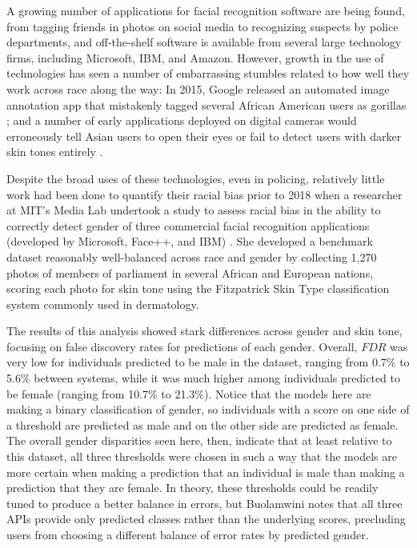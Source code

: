 \documentclass[]{krantz}
\begin{document}
A growing number of applications for facial recognition software are
being found, from tagging friends in photos on social media to
recognizing suspects by police departments, and off-the-shelf software
is available from several large technology firms, including Microsoft,
IBM, and Amazon. However, growth in the use of technologies has seen a
number of embarrassing stumbles related to how well they work across
race along the way: In 2015, Google released an automated image
annotation app that mistakenly tagged several African American users as
gorillas \citep{dougherty2015}; and a number of early applications
deployed on digital cameras would erroneously tell Asian users to open
their eyes or fail to detect users with darker skin tones entirely
\citep{rose2010}.

Despite the broad uses of these technologies, even in policing,
relatively little work had been done to quantify their racial bias prior
to 2018 when a researcher at MIT's Media Lab undertook a study to assess
racial bias in the ability to correctly detect gender of three
commercial facial recognition applications (developed by Microsoft,
Face++, and IBM) \citep{buolamwini2018}. She developed a benchmark
dataset reasonably well-balanced across race and gender by collecting
1,270 photos of members of parliament in several African and European
nations, scoring each photo for skin tone using the Fitzpatrick Skin
Type classification system commonly used in dermatology.

The results of this analysis showed stark differences across gender and
skin tone, focusing on false discovery rates for predictions of each
gender. Overall, \(FDR\) was very low for individuals predicted to be
male in the dataset, ranging from 0.7\% to 5.6\% between systems, while
it was much higher among individuals predicted to be female (ranging
from 10.7\% to 21.3\%). Notice that the models here are making a binary
classification of gender, so individuals with a score on one side of a
threshold are predicted as male and on the other side are predicted as
female. The overall gender disparities seen here, then, indicate that at
least relative to this dataset, all three thresholds were chosen in such
a way that the models are more certain when making a prediction that an
individual is male than making a prediction that they are female. In
theory, these thresholds could be readily tuned to produce a better
balance in errors, but Buolamwini notes that all three APIs provide only
predicted classes rather than the underlying scores, precluding users
from choosing a different balance of error rates by predicted gender.
\end{document}
